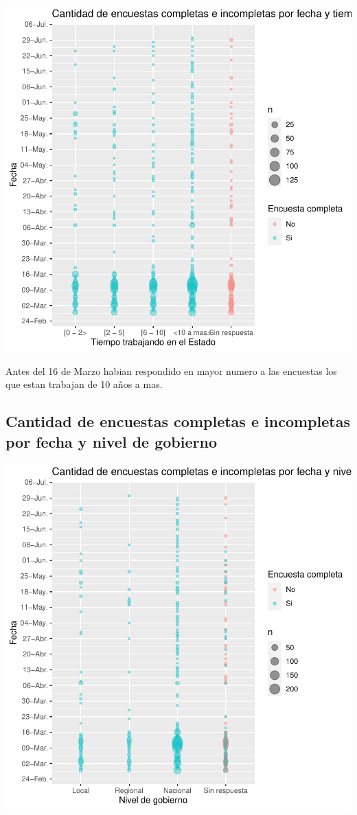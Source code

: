 \documentclass{article}
\begin{document}
\includegraphics{seguimientov3-006}

Antes del 16 de Marzo habian respondido en mayor numero a las encuestas los que estan trabajan de 10 años a mas.

\subsection{Cantidad de encuestas completas e incompletas por fecha y nivel de gobierno}

\includegraphics{seguimientov3-007}
\end{document}
